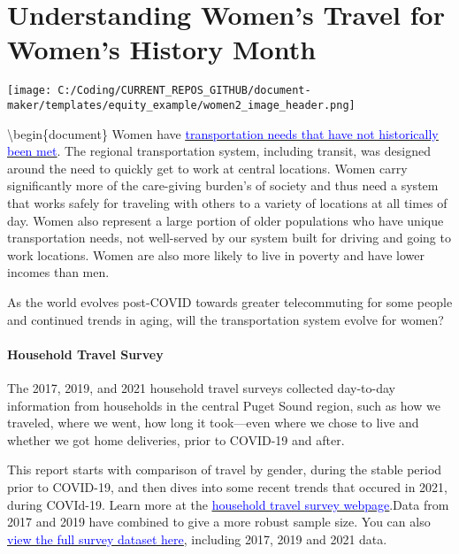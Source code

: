 \documentclass[
  12pt,
]{article}
\author{Suzanne Childress \& Meg Grzybowski}
\date{2023-02-16}
\begin{document}
\setmainfont{Poppins}

\hypertarget{understanding-womens-travel-for-womens-history-month}{%
\section{Understanding Women's Travel for Women's History
Month}\label{understanding-womens-travel-for-womens-history-month}}

\texttt{[image: C:/Coding/CURRENT\_REPOS\_GITHUB/document-maker/templates/equity\_example/women2\_image\_header.png]}

\textbackslash begin\{document\} Women have
\href{http://libraryarchives.metro.net/DB_Attachments/2019-0294/UnderstandingHowWomenTravel_FullReport_FINAL.pdf}{\underline{\textcolor{blue}{transportation needs that have not historically been met}}}.
The regional transportation system, including transit, was designed
around the need to quickly get to work at central locations. Women carry
significantly more of the care-giving burden's of society and thus need
a system that works safely for traveling with others to a variety of
locations at all times of day. Women also represent a large portion of
older populations who have unique transportation needs, not well-served
by our system built for driving and going to work locations. Women are
also more likely to live in poverty and have lower incomes than men.

As the world evolves post-COVID towards greater telecommuting for some
people and continued trends in aging, will the transportation system
evolve for women?

\hypertarget{household-travel-survey}{%
\paragraph{Household Travel Survey}\label{household-travel-survey}}

The 2017, 2019, and 2021 household travel surveys collected day-to-day
information from households in the central Puget Sound region, such as
how we traveled, where we went, how long it took---even where we chose
to live and whether we got home deliveries, prior to COVID-19 and after.

This report starts with comparison of travel by gender, during the
stable period prior to COVID-19, and then dives into some recent trends
that occured in 2021, during COVId-19. Learn more at the
\href{https://www.psrc.org/our-work/household-travel-survey-program}{\underline{\textcolor{blue}{household travel survey webpage}}}.Data
from 2017 and 2019 have combined to give a more robust sample size. You
can also
\href{https://household-travel-survey-psregcncl.hub.arcgis.com}{\underline{\textcolor{blue}{view the full survey dataset here}}},
including 2017, 2019 and 2021 data.
\end{document}
